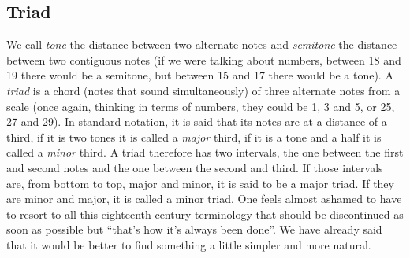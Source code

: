 \documentclass[]{report}
\begin{document}
\subsection{Triad}
We call \emph{tone} the distance between two alternate notes and \emph{semitone} the distance between two contiguous notes (if we were talking about numbers, between 18 and 19 there would be a semitone, but between 15 and 17 there would be a tone).
A \emph{triad} is a chord (notes that sound simultaneously) of three alternate notes from a scale (once again, thinking in terms of numbers, they could be 1, 3 and 5, or 25, 27 and 29). In standard notation, it is said that its notes are at a distance of a third, if it is two tones it is called a \emph{major} third, if it is a tone and a half it is called a \emph{minor} third. A triad therefore has two intervals, the one between the first and second notes and the one between the second and third. If those intervals are, from bottom to top, major and minor, it is said to be a major triad. If they are minor and major, it is called a minor triad.
One feels almost ashamed to have to resort to all this eighteenth-century terminology that should be discontinued as soon as possible but ``that's how it's always been done''. We have already said that it would be better to find something a little simpler and more natural.
\end{document}
